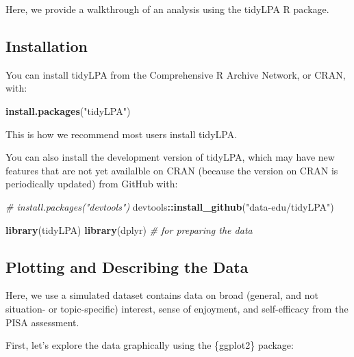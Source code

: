 \documentclass[man]{apa6}
\newenvironment{Shaded}{\begin{snugshade}}{\end{snugshade}}
\newcommand{\CommentTok}[1]{\textcolor[rgb]{0.56,0.35,0.01}{\textit{#1}}}
\newcommand{\KeywordTok}[1]{\textcolor[rgb]{0.13,0.29,0.53}{\textbf{#1}}}
\newcommand{\NormalTok}[1]{#1}
\newcommand{\OperatorTok}[1]{\textcolor[rgb]{0.81,0.36,0.00}{\textbf{#1}}}
\newcommand{\StringTok}[1]{\textcolor[rgb]{0.31,0.60,0.02}{#1}}
\begin{document}
Here, we provide a walkthrough of an analysis using the tidyLPA R package.

\hypertarget{installation}{%
\subsection{Installation}\label{installation}}

You can install tidyLPA from the Comprehensive R Archive Network, or CRAN, with:

\begin{Shaded}
\begin{Highlighting}[]
\KeywordTok{install.packages}\NormalTok{(}\StringTok{"tidyLPA"}\NormalTok{)}
\end{Highlighting}
\end{Shaded}

This is how we recommend most users install tidyLPA.

You can also install the development version of tidyLPA, which may have new
features that are not yet availalble on CRAN (because the version on CRAN is
periodically updated) from GitHub with:

\begin{Shaded}
\begin{Highlighting}[]
\CommentTok{# install.packages("devtools")}
\NormalTok{devtools}\OperatorTok{::}\KeywordTok{install_github}\NormalTok{(}\StringTok{"data-edu/tidyLPA"}\NormalTok{)}
\end{Highlighting}
\end{Shaded}

\begin{Shaded}
\begin{Highlighting}[]
\KeywordTok{library}\NormalTok{(tidyLPA)}
\KeywordTok{library}\NormalTok{(dplyr) }\CommentTok{# for preparing the data}
\end{Highlighting}
\end{Shaded}

\hypertarget{plotting-and-describing-the-data}{%
\subsection{Plotting and Describing the Data}\label{plotting-and-describing-the-data}}

Here, we use a simulated dataset contains data on broad (general, and not situation- or topic-specific) interest, sense of enjoyment, and
self-efficacy from the PISA assessment.

First, let's explore the data graphically using the \{ggplot2\} package:
\end{document}

